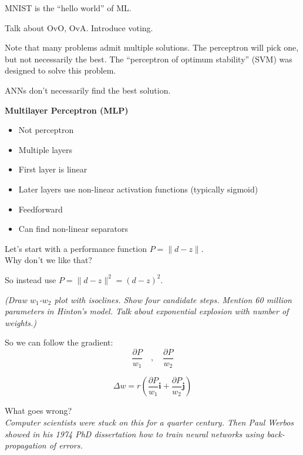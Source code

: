 
MNIST is the ``hello world'' of ML.

Talk about OvO, OvA.  Introduce voting.

Note that many problems admit multiple solutions.  The perceptron will
pick one, but not necessarily the best.  The ``perceptron of optimum
stability'' (SVM) was designed to solve this problem.

ANNs don't necessarily find the best solution.

\textbf{Multilayer Perceptron (MLP)}
\begin{itemize}
\item Not perceptron
\item Multiple layers
\item First layer is linear
\item Later layers use non-linear activation functions (typically sigmoid)
\item Feedforward
\item Can find non-linear separators
\end{itemize}


\medskip

\medskip

Let's start with a performance function $P=\| d-z \|$.  \\
Why don't we like that?

So instead use $P=\| d-z \|^2 = (d-z)^2$.

\textit{(Draw $w_1$-$w_2$ plot with isoclines.  Show four candidate
  steps.  Mention 60 million parameters in Hinton's model.  Talk about
  exponential explosion with number of weights.)}

So we can follow the gradient:
\begin{displaymath}
  \frac{\partial P}{w_1} \quad , \quad   \frac{\partial P}{w_2}
\end{displaymath}

\begin{displaymath}
  \Delta w = r\left( \frac{\partial P}{w_1} \mathbf{i} +
    \frac{\partial P}{w_2} \mathbf{j} \right)
\end{displaymath}

What goes wrong?\\

\textit{Computer scientists were stuck on this for a quarter century.
Then Paul Werbos showed in his 1974 PhD dissertation how to train
neural networks using back-propagation of errors.}

